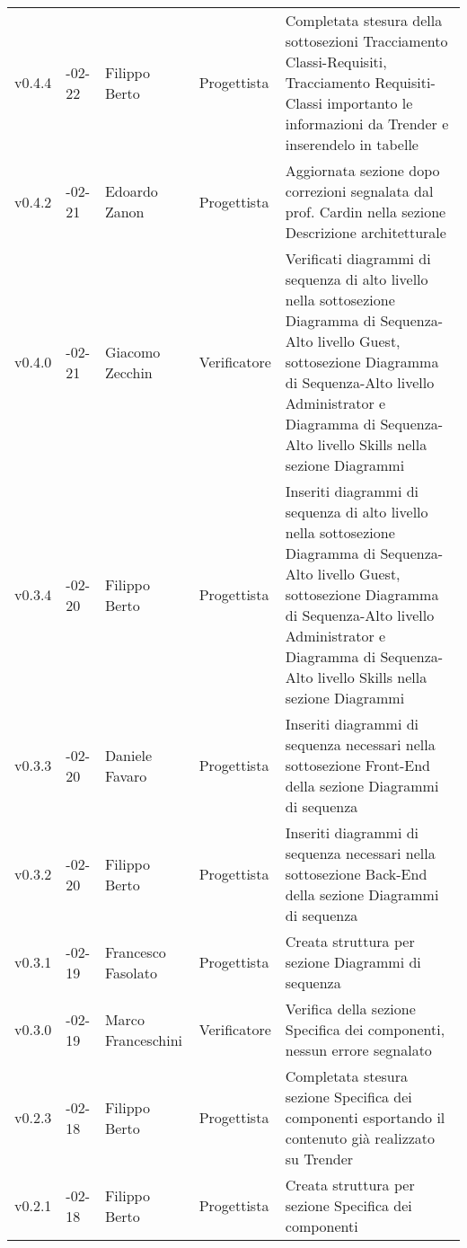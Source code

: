\begin{longtable} { >{\centering}p{1.4cm} >{\centering}p{2cm} >{\centering}p{2.3cm} >{\centering}p{2.7cm} p{5.5cm} }
	\addlinespace[0.4em]
	\midrule
	v0.4.4 & 2017-02-22 & Filippo Berto & Progettista & Completata stesura della sottosezioni Tracciamento Classi-Requisiti, Tracciamento Requisiti-Classi importanto le informazioni da Trender e inserendelo in tabelle \\
	\addlinespace[0.4em]
	\midrule
	\addlinespace[0.4em]
	v0.4.2 & 2017-02-21 & Edoardo Zanon & Progettista & Aggiornata sezione dopo correzioni segnalata dal prof. Cardin nella sezione Descrizione architetturale  \\
	\addlinespace[0.4em]
	\midrule
	\addlinespace[0.4em]
	v0.4.0 & 2017-02-21 & Giacomo Zecchin & Verificatore & Verificati diagrammi di sequenza di alto livello nella sottosezione Diagramma di Sequenza-Alto livello Guest,  sottosezione Diagramma di Sequenza-Alto livello Administrator e  Diagramma di Sequenza-Alto livello Skills nella sezione Diagrammi \\
	\addlinespace[0.4em]
	\midrule
	\addlinespace[0.4em]
	v0.3.4 & 2017-02-20 & Filippo Berto & Progettista & Inseriti diagrammi di sequenza di alto livello nella sottosezione Diagramma di Sequenza-Alto livello Guest,  sottosezione Diagramma di Sequenza-Alto livello Administrator e  Diagramma di Sequenza-Alto livello Skills nella sezione Diagrammi \\
	\addlinespace[0.4em]
	\midrule
	\addlinespace[0.4em]
	v0.3.3 & 2017-02-20 & Daniele Favaro & Progettista & Inseriti diagrammi di sequenza necessari nella sottosezione Front-End della sezione Diagrammi di  sequenza \\
	\addlinespace[0.4em]
	\midrule
	\addlinespace[0.4em]
	v0.3.2 & 2017-02-20 & Filippo Berto & Progettista & Inseriti diagrammi di sequenza necessari nella sottosezione Back-End della sezione Diagrammi di sequenza \\
	\addlinespace[0.4em]
	\midrule
	\addlinespace[0.4em]
	v0.3.1 & 2017-02-19 & Francesco Fasolato & Progettista & Creata struttura per sezione Diagrammi di  sequenza \\
	\addlinespace[0.4em]
	\midrule
	\addlinespace[0.4em]
	v0.3.0 & 2017-02-19 &  Marco Franceschini & Verificatore & Verifica della sezione Specifica dei componenti, nessun errore segnalato \\
	\addlinespace[0.4em]
	\midrule
	\addlinespace[0.4em]
	v0.2.3 & 2017-02-18 &  Filippo Berto & Progettista & Completata stesura sezione Specifica dei componenti esportando il contenuto già realizzato su Trender \\
	\addlinespace[0.4em]
	\midrule
	\addlinespace[0.4em]
	v0.2.1 & 2017-02-18 &  Filippo Berto & Progettista & Creata struttura per sezione Specifica dei componenti \\

\end{longtable}
